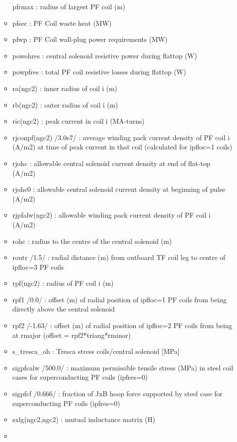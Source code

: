 \documentclass[]{article}
\begin{document}
\begin{itemize}
\begin{itemize}
    pfrmax : radius of largest PF coil (m)
  \item
    pfsec : PF Coil waste heat (MW)
  \item
    pfwp : PF Coil wall-plug power requirements (MW)
  \item
    powohres : central solenoid resistive power during flattop (W)
  \item
    powpfres : total PF coil resistive losses during flattop (W)
  \item
    ra(ngc2) : inner radius of coil i (m)
  \item
    rb(ngc2) : outer radius of coil i (m)
  \item
    ric(ngc2) : peak current in coil i (MA-turns)
  \item
    rjconpf(ngc2) /3.0e7/ : average winding pack current density of PF
    coil i (A/m2) at time of peak current in that coil (calculated for
    ipfloc=1 coils)
  \item
    rjohc : allowable central solenoid current density at end of
    flat-top (A/m2)
  \item
    rjohc0 : allowable central solenoid current density at beginning of
    pulse (A/m2)
  \item
    rjpfalw(ngc2) : allowable winding pack current density of PF coil i
    (A/m2)
  \item
    rohc : radius to the centre of the central solenoid (m)
  \item
    routr /1.5/ : radial distance (m) from outboard TF coil leg to
    centre of ipfloc=3 PF coils
  \item
    rpf(ngc2) : radius of PF coil i (m)
  \item
    rpf1 /0.0/ : offset (m) of radial position of ipfloc=1 PF coils from
    being directly above the central solenoid
  \item
    rpf2 /-1.63/ : offset (m) of radial position of ipfloc=2 PF coils
    from being at rmajor (offset = rpf2*triang*rminor)
  \item
    s\_tresca\_oh : Tresca stress coils/central solenoid {[}MPa{]}
  \item
    sigpfcalw /500.0/ : maximum permissible tensile stress (MPa) in
    steel coil cases for superconducting PF coils (ipfres=0)
  \item
    sigpfcf /0.666/ : fraction of JxB hoop force supported by steel case
    for superconducting PF coils (ipfres=0)
  \item
    sxlg(ngc2,ngc2) : mutual inductance matrix (H)
  \item

\end{itemize}
\end{itemize}
\end{document}
